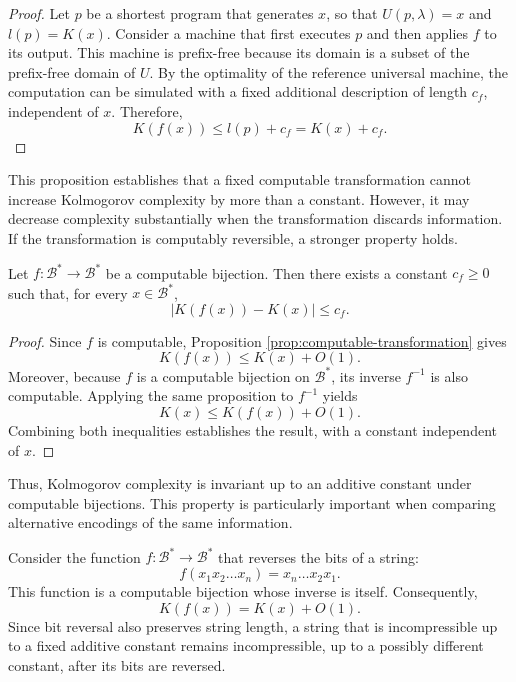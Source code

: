 \begin{proof}
Let $p$ be a shortest program that generates $x$, so that $U(p,\lambda)=x$ and $l(p)=K(x)$. Consider a machine that first executes $p$ and then applies $f$ to its output. This machine is prefix-free because its domain is a subset of the prefix-free domain of $U$. By the optimality of the reference universal machine, the computation can be simulated with a fixed additional description of length $c_f$, independent of $x$. Therefore,
\[
K(f(x)) \leq l(p)+c_f = K(x)+c_f.
\]
\end{proof}

This proposition establishes that a fixed computable transformation cannot increase Kolmogorov complexity by more than a constant. However, it may decrease complexity substantially when the transformation discards information. If the transformation is computably reversible, a stronger property holds.

\begin{proposition}
\label{prop:computable-bijection}
Let $f:\mathcal{B}^*\rightarrow\mathcal{B}^*$ be a computable bijection. Then there exists a constant $c_f\geq 0$ such that, for every $x\in\mathcal{B}^*$,
\[
|K(f(x))-K(x)|\leq c_f.
\]
\end{proposition}

\begin{proof}
Since $f$ is computable, Proposition \ref{prop:computable-transformation} gives
\[
K(f(x))\leq K(x)+O(1).
\]
Moreover, because $f$ is a computable bijection on $\mathcal{B}^*$, its inverse $f^{-1}$ is also computable. Applying the same proposition to $f^{-1}$ yields
\[
K(x)\leq K(f(x))+O(1).
\]
Combining both inequalities establishes the result, with a constant independent of $x$.
\end{proof}

Thus, Kolmogorov complexity is invariant up to an additive constant under computable bijections. This property is particularly important when comparing alternative encodings of the same information.

\begin{example}
Consider the function $f:\mathcal{B}^*\rightarrow\mathcal{B}^*$ that reverses the bits of a string:
\[
f(x_1x_2\ldots x_n)=x_n\ldots x_2x_1.
\]
This function is a computable bijection whose inverse is itself. Consequently,
\[
K(f(x))=K(x)+O(1).
\]
Since bit reversal also preserves string length, a string that is incompressible up to a fixed additive constant remains incompressible, up to a possibly different constant, after its bits are reversed.
\end{example}

